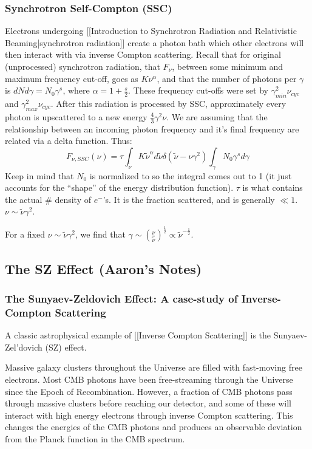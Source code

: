 \documentclass{article}
\def\hf{\frac12}
\def\hf{\frac12}
\def\tn{{\tilde\nu}}
\begin{document}
\subsubsection{ Synchrotron Self-Compton (SSC)}

Electrons undergoing [[Introduction to Synchrotron Radiation and Relativistic Beaming|synchrotron radiation]] create a photon bath which
other electrons will then interact with via inverse Compton scattering.  Recall
that for original (unprocessed) synchrotron radiation, that $F_\nu$, between
some minimum and maximum frequency cut-off, goes as $K\nu^\alpha$, and that
the number of photons per $\gamma$ is ${dN}{ d\gamma}=N_0\gamma^s$, where
$\alpha={1+\frac{s}{2}}$.  These frequency cut-offs were set by $\gamma_{min}^2
\nu_{cyc}$ and $\gamma_{max}^2\nu_{cyc}$.  After this radiation is processed
by SSC, approximately every photon is upscattered to a new energy
$\frac{4}{3}\gamma^2\nu$.  We are assuming that the relationship between
an incoming photon frequency and it's final frequency are related via a
delta function.  Thus:
\def\tn{{\tilde\nu}}
$$F_{\nu,SSC}(\nu)=\tau\int_{\tn}{K\tn^\alpha d\tn\delta\left(\tn-
{\nu}{\gamma^2}\right)\int_\gamma{N_0\gamma^sd\gamma}}$$
Keep in mind that $N_0$ is normalized to so the integral comes out to 1
(it just accounts for the 
``shape'' of the energy distribution function). $\tau$ is what contains the actual
\# density of $e^-$'s.  It is the fraction scattered,
and is generally $\ll1$. $\nu\sim\tn\gamma^2$.\par
For a fixed $\nu\sim\tn\gamma^2$, we find that $\gamma\sim\left(\frac{\nu}{
\tn}\right)^\hf\propto\tn^{-\hf}$.

\subsection{The SZ Effect (Aaron's Notes)}

\subsubsection{The Sunyaev-Zeldovich Effect: A case-study of Inverse-Compton Scattering
}

A classic astrophysical example of [[Inverse Compton Scattering]] is the Sunyaev-Zel'dovich (SZ) effect.

Massive galaxy clusters throughout the Universe are filled with fast-moving free electrons. Most CMB photons have been free-streaming through the Universe since the Epoch of Recombination. However, a fraction of CMB photons pass through massive clusters before reaching our detector, and some of these will interact with high energy electrons through inverse Compton scattering. This changes the energies of the CMB photons and produces an observable deviation from the Planck function in the CMB spectrum. 
\end{document}
